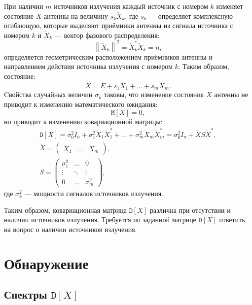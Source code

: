 \documentclass[a4paper,12pt]{article}
\newcommand{\expectation}[1]{\mathtt{M} \left[ #1 \right]}
\newcommand{\variance}[1]{\mathtt{D} \left[ #1 \right]}
\newcommand{\norm}[1]{\left \| #1 \right \|}
\begin{document}
    При наличии $m$ источников излучения каждый источник с номером $k$ изменяет состояние $X$ антенны на величину $s_k \breve{X}_k$, где $s_k$ --- определяет комплексную огибающую,
    которые выделяют приёмники антенны из сигнала источника с номером $k$ и $\breve{X}_k$ --- вектор фазового распределения:
    \[
        \norm{\breve{X}_k}^2
        = \breve{X}_k^* \breve{X}_k
        = n,
    \]
    определяется геометрическим расположением приёмников антенны и направлением действия источника излучения с номером $k$. Таким образом, состояние:
    \[
        X = E + s_1 \breve{X}_1 + \dots + s_m \breve{X}_m .
    \]
    Cвойства случайных величин $\sigma_k$ таковы, что изменение состояния $X$ антенны не приводит к изменению математического ожидания:
    \[
        \expectation{X} = 0,
    \]
    но приводит к изменению ковариационной матрицы:
    \begin{gather*}
        \variance{X}
        = \sigma_0^2 I_n + \sigma_1^2 \breve{X}_1 \breve{X}_1^* + \dots + \sigma_m^2 \breve{X}_m \breve{X}_m^*
        = \sigma_0^2 I_n + \breve{X} S \breve{X}^* , \\
        \breve{X}
        = \begin{pmatrix}
              \breve{X}_1 & \dots & \breve{X}_m
        \end{pmatrix}, \\
        S = \begin{pmatrix}
                \sigma_1^2 & \dots  & 0          \\
                \vdots     & \ddots & \vdots     \\
                0          & \dots  & \sigma_m^2
        \end{pmatrix} ,
    \end{gather*}
    где $\sigma_k^2$ --- мощности сигналов источников излучения.

    Таким образом, ковариационная матрица $\variance{X}$ различна при отсутствии и наличии источников излучения. Требуется по заданной матрице $\variance{X}$ ответить на вопрос о
    наличии источников излучения.


    \section{Обнаружение}

    \subsection{Спектры $\variance{X}$}
\end{document}
